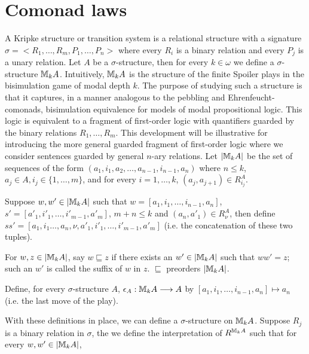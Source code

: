 \section{Comonad laws}
A Kripke structure or transition system is a relational structure with a signature $\sigma = <R_{1},\dots,R_{m},P_{1},\dots,P_{n}>$ where every $R_{i}$ is a binary relation and every $P_{j}$ is a unary relation. Let $A$ be a $\sigma$-structure, then for every $k \in \omega$ we define a  $\sigma$-structure ${\mathbb{M}_{k}A}$. Intuitively, ${\mathbb{M}_{k}A}$ is the structure of the finite Spoiler plays in the bisimulation game of modal depth $k$. The purpose of studying such a structure is that it captures, in a manner analogous to the pebbling and Ehrenfeucht-{\Fraisse} comonads, bisimulation equivalence for models of modal propositional logic. This logic is equivalent to a fragment of first-order logic with quantifiers guarded by the binary relations $R_{1},\dots,R_{m}$. This development will be illustrative for introducing the more general guarded fragment of first-order logic where we consider sentences guarded by general $n$-ary relations. Let $|{\mathbb{M}_{k}A}|$ be the set of sequences of the form $(a_{1},i_{1},a_{2},\dots,a_{n-1},i_{n-1},a_{n})$ where $n \leq k$, $a_{j} \in A, i_{j} \in \{1,\dots,m\}$, and for every $i = 1,\dots,k$, $(a_{j},a_{j+1}) \in R^{A}_{i_{j}}$.   
\begin{defn}
Suppose $w,w' \in |{\mathbb{M}_{k}A}|$ such that $w = [a_{1},i_{1},\dots,i_{n-1},a_{n}]$, $s' = [a'_{1},i'_{1},\dots,i'_{m-1},a'_{m}]$, $m+n \leq k$ and $(a_{n},a'_{1}) \in R^{A}_{\nu}$, then define $ss' = [a_{1},i_{1}
\dots,a_{n},\nu,a'_{1},i'_{1},\dots,i'_{m-1},a'_{m}]$ (i.e. the concatenation of these two tuples).
\end{defn}
\begin{defn}
For $w,z \in |{\mathbb{M}_{k}A}|$, say $w \sqsubseteq z$ if there exists an $w' \in |{\mathbb{M}_{k}A}|$ such that $ww' = z$; such an $w'$ is called the suffix of $w$ in $z$. $\sqsubseteq$ preorders $|{\mathbb{M}_{k}A}|$.
\end{defn}
\begin{defn}
Define, for every $\sigma$-structure $A$, $\epsilon_{A}:{\mathbb{M}_{k}A} \longrightarrow A$ by $[a_{1},i_{1},\dots,i_{n-1},a_{n}] \mapsto a_{n}$ (i.e. the last move of the play). 
\label{defn:epsilon}
\end{defn}
With these definitions in place, we can define a $\sigma$-structure on ${\mathbb{M}_{k}A}$. Suppose $R_{j}$ is a binary relation in $\sigma$, the we define the interpretation of $R^{{\mathbb{M}_{k}A}}$ such that for every $w,w' \in |{\mathbb{M}_{k}A}|$,
